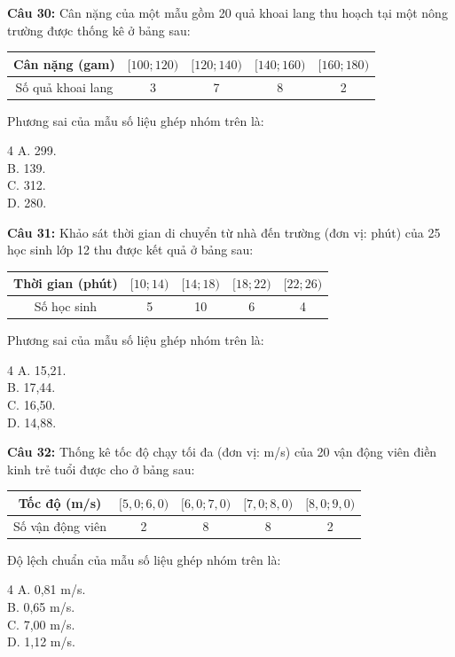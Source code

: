 \documentclass[12pt]{article}
\begin{document}
	\vspace{4mm}
	
	\noindent \textbf{Câu 30:} Cân nặng của một mẫu gồm 20 quả khoai lang thu hoạch tại một nông trường được thống kê ở bảng sau:
	\begin{center}
		\renewcommand{\arraystretch}{1.3}
		\begin{tabular}{|c|c|c|c|c|}
			\hline
			Cân nặng (gam) & $[100; 120)$ & $[120; 140)$ & $[140; 160)$ & $[160; 180)$ \\
			\hline
			Số quả khoai lang & 3 & 7 & 8 & 2 \\
			\hline
		\end{tabular}
	\end{center}
	Phương sai của mẫu số liệu ghép nhóm trên là:
	\begin{multicols}{4}
		A. 299. \\
		B. 139. \\
		C. 312. \\
		D. 280.
	\end{multicols}
	
	\vspace{4mm}
	
	\noindent \textbf{Câu 31:} Khảo sát thời gian di chuyển từ nhà đến trường (đơn vị: phút) của 25 học sinh lớp 12 thu được kết quả ở bảng sau:
	\begin{center}
		\renewcommand{\arraystretch}{1.3}
		\begin{tabular}{|c|c|c|c|c|}
			\hline
			Thời gian (phút) & $[10; 14)$ & $[14; 18)$ & $[18; 22)$ & $[22; 26)$ \\
			\hline
			Số học sinh & 5 & 10 & 6 & 4 \\
			\hline
		\end{tabular}
	\end{center}
	Phương sai của mẫu số liệu ghép nhóm trên là:
	\begin{multicols}{4}
		A. 15,21. \\
		B. 17,44. \\
		C. 16,50. \\
		D. 14,88.
	\end{multicols}
	
	\vspace{4mm}
	
	\noindent \textbf{Câu 32:} Thống kê tốc độ chạy tối đa (đơn vị: m/s) của 20 vận động viên điền kinh trẻ tuổi được cho ở bảng sau:
	\begin{center}
		\renewcommand{\arraystretch}{1.3}
		\begin{tabular}{|c|c|c|c|c|}
			\hline
			Tốc độ (m/s) & $[5,0; 6,0)$ & $[6,0; 7,0)$ & $[7,0; 8,0)$ & $[8,0; 9,0)$ \\
			\hline
			Số vận động viên & 2 & 8 & 8 & 2 \\
			\hline
		\end{tabular}
	\end{center}
	Độ lệch chuẩn của mẫu số liệu ghép nhóm trên là:
	\begin{multicols}{4}
		A. 0,81 m/s. \\
		B. 0,65 m/s. \\
		C. 7,00 m/s. \\
		D. 1,12 m/s.
	\end{multicols}
	
\end{document}
